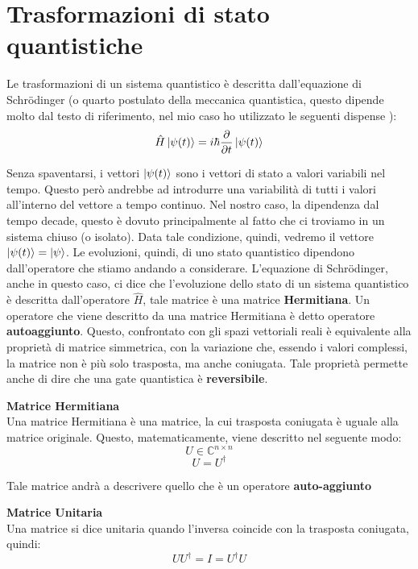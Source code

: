 \section{Trasformazioni di stato quantistiche}
Le trasformazioni di un sistema quantistico è descritta dall'equazione di Schrödinger (o quarto postulato della meccanica quantistica, questo dipende molto dal testo di riferimento, nel mio caso ho utilizzato le seguenti dispense \cite{giliberti2007limite}):
\[
\hat{H} \ket{\psi(t)} = i \hbar \frac{\partial}{\partial t} \ket{\psi(t)}
\]

Senza spaventarsi, i vettori \(\ket{\psi(t)}\) sono i vettori di stato a valori variabili nel tempo. Questo però andrebbe ad introdurre una variabilità di tutti i valori all'interno del vettore a tempo continuo. Nel nostro caso, la dipendenza dal tempo decade, questo è dovuto principalmente al fatto che ci troviamo in un sistema chiuso (o isolato). Data tale condizione, quindi, vedremo il vettore \(\ket{\psi(t)} = \ket{\psi}\).
Le evoluzioni, quindi, di uno stato quantistico dipendono dall'operatore che stiamo andando a considerare. L'equazione di Schrödinger, anche in questo caso, ci dice che l'evoluzione dello stato di un sistema quantistico è descritta dall'operatore \(\hat{H}\), tale matrice è una matrice \textbf{Hermitiana}.
Un operatore che viene descritto da una matrice Hermitiana è detto operatore \textbf{autoaggiunto}. Questo, confrontato con gli spazi vettoriali reali è equivalente alla proprietà di matrice simmetrica, con la variazione che, essendo i valori complessi, la matrice non è più solo trasposta, ma anche coniugata. Tale proprietà permette anche di dire che una gate quantistica è \textbf{reversibile}.

\begin{info}
\textbf{Matrice Hermitiana} \\
Una matrice Hermitiana è una matrice, la cui trasposta coniugata è uguale alla matrice originale. Questo, matematicamente, viene descritto nel seguente modo:
\[
U \in \mathbb{C}^{n \times n}
\]
\[
U = U^\dagger
\]

Tale matrice andrà a descrivere quello che è un operatore \textbf{auto-aggiunto}
\end{info}

\begin{info}
\textbf{Matrice Unitaria}\\
Una matrice si dice unitaria quando l'inversa coincide con la trasposta coniugata, quindi:
\[
U U^\dagger = I = U^\dagger U
\]
\end{info}


